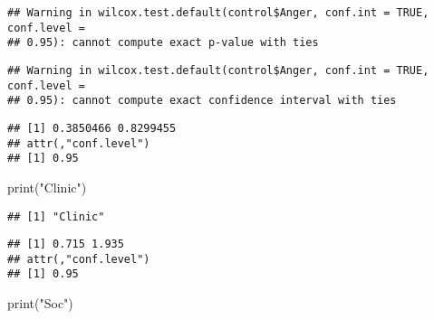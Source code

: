 \documentclass[
]{article}
\newenvironment{Shaded}{\begin{snugshade}}{\end{snugshade}}
\newcommand{\AttributeTok}[1]{\textcolor[rgb]{0.77,0.63,0.00}{#1}}
\newcommand{\ConstantTok}[1]{\textcolor[rgb]{0.00,0.00,0.00}{#1}}
\newcommand{\FloatTok}[1]{\textcolor[rgb]{0.00,0.00,0.81}{#1}}
\newcommand{\FunctionTok}[1]{\textcolor[rgb]{0.00,0.00,0.00}{#1}}
\newcommand{\NormalTok}[1]{#1}
\newcommand{\SpecialCharTok}[1]{\textcolor[rgb]{0.00,0.00,0.00}{#1}}
\newcommand{\StringTok}[1]{\textcolor[rgb]{0.31,0.60,0.02}{#1}}
\begin{document}
\begin{Shaded}
\end{Shaded}

\begin{verbatim}
## Warning in wilcox.test.default(control$Anger, conf.int = TRUE, conf.level =
## 0.95): cannot compute exact p-value with ties
\end{verbatim}

\begin{verbatim}
## Warning in wilcox.test.default(control$Anger, conf.int = TRUE, conf.level =
## 0.95): cannot compute exact confidence interval with ties
\end{verbatim}

\begin{verbatim}
## [1] 0.3850466 0.8299455
## attr(,"conf.level")
## [1] 0.95
\end{verbatim}

\begin{Shaded}
\begin{Highlighting}[]
\FunctionTok{print}\NormalTok{(}\StringTok{"Clinic"}\NormalTok{)}
\end{Highlighting}
\end{Shaded}

\begin{verbatim}
## [1] "Clinic"
\end{verbatim}

\begin{Shaded}
\end{Shaded}

\begin{verbatim}
## [1] 0.715 1.935
## attr(,"conf.level")
## [1] 0.95
\end{verbatim}

\begin{Shaded}
\begin{Highlighting}[]
\FunctionTok{print}\NormalTok{(}\StringTok{"Soc"}\NormalTok{)}
\end{Highlighting}
\end{Shaded}
\end{document}
